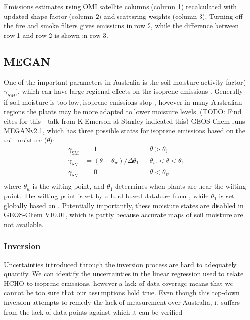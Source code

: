     {Emissions estimates using OMI satellite columns (column 1) recalculated with updated shape factor (column 2) and scattering weights (column 3). Turning off the fire and smoke filters gives emissions in row 2, while the difference between row 1 and row 2 is shown in row 3.}
    {\label{BioIsop:Uncertainty:Fire:fig_emiss_without_fire_filter}}
    
  
  \subsection{MEGAN}

    One of the important parameters in Australia is the soil moisture activity factor($\gamma_{SM}$), which can have large regional effects on the isoprene emissions \parencite{Sindelarova2014,Bauwens2016}.
    Generally if soil moisture is too low, isoprene emissions stop \parencite{Pegoraro2004,Niinemets2010}, however in many Australian regions the plants may be more adapted to lower moisture levels. (TODO: Find cites for this - talk from K Emerson at Stanley indicated this)
    GEOS-Chem runs MEGANv2.1, which has three possible states for isoprene emissions based on the soil moisture ($\theta$):
    \begin{align*}
    \gamma_\mathrm{SM} & = 1 && \theta > \theta_1 \\
    \gamma_\mathrm{SM} & = (\theta-\theta_w)/\Delta\theta_1  && \theta_w < \theta < \theta_1 \\
    \gamma_\mathrm{SM} & = 0 && \theta < \theta_w \\
    \end{align*}
    where $\theta_w$ is the wilting point, and $\theta_1$ determines when plants are near the wilting point.
    The wilting point is set by a land based database from \textcite{Chen2001}, while $\theta_1$ is set globally based on \textcite{Pegoraro2004}.
    Potentially importantly, these moisture states are disabled in GEOS-Chem V10.01, which is partly because accurate maps of soil moisture are not available.
  
  \subsubsection{Inversion}
  
    Uncertainties introduced through the inversion process are hard to adequately quantify. 
    We can identify the uncertainties in the linear regression used to relate HCHO to isoprene emissions, however a lack of data coverage means that we cannot be too sure that our assumptions hold true.
    Even though this top-down inversion attempts to remedy the lack of measurement over Australia, it suffers from the lack of data-points against which it can be verified.
    
